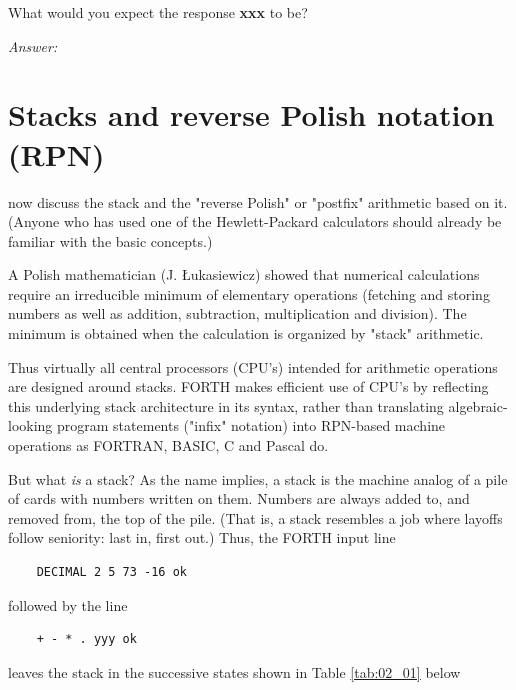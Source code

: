 What would you expect the response \textbf{xxx} to be?

\textit{Answer:} 


\section{Stacks and reverse Polish notation (RPN)}
 now discuss the stack and the "reverse Polish" or "postfix" arithmetic based on it. (Anyone who has used one of the Hewlett-Packard calculators should already be familiar with the basic concepts.)

A Polish mathematician (J. {\L}ukasiewicz) showed that numerical calculations require an irreducible minimum of elementary operations (fetching and storing numbers as well as addition, subtraction, multiplication and division). The minimum is obtained when the calculation is organized by "stack" arithmetic.

Thus virtually all central processors (CPU's) intended for arithmetic operations are designed around stacks. FORTH makes efficient use of CPU's by reflecting this underlying stack architecture in its syntax, rather than translating algebraic-looking program statements ("infix" notation) into RPN-based machine operations as FORTRAN, BASIC, C and Pascal do.

But what \textit{is} a stack? As the name implies, a stack is the machine analog of a pile of cards with numbers written on them. Numbers are always added to, and removed from, the top of the pile. (That is, a stack resembles a job where layoffs follow seniority: last in, first out.) Thus, the FORTH input line

\begin{lstlisting}
    DECIMAL 2 5 73 -16 ok
\end{lstlisting}

followed by the line

\begin{lstlisting}
    + - * . yyy ok
\end{lstlisting}
leaves the stack in the successive states shown in Table \ref{tab:02_01} below

